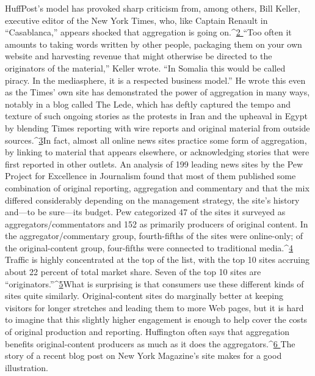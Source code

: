 HuffPost’s model has provoked sharp criticism from, among others, Bill Keller,
executive editor of the New York Times, who, like Captain Renault in ``Casablanca,''
appears shocked that aggregation is going on.^{\href{#endnotes-ch6}{2 }}``Too often it amounts
to taking words written by other people, packaging them on your own website
and harvesting revenue that might otherwise be directed to the originators of
the material,'' Keller wrote. ``In Somalia this would be called piracy. In the mediasphere,
it is a respected business model.'' He wrote this even as the Times’ own
site has demonstrated the power of aggregation in many ways, notably in a blog
called The Lede, which has deftly captured the tempo and texture of such ongoing
stories as the protests in Iran and the upheaval in Egypt by blending Times
reporting with wire reports and original material from outside sources.^{\href{#endnotes-ch6}{3}}In fact, almost all online news sites practice some form of aggregation, by linking
to material that appears elsewhere, or acknowledging stories that were first
reported in other outlets. An analysis of 199 leading news sites by the Pew Project
for Excellence in Journalism found that most of them published some combination
of original reporting, aggregation and commentary and that the mix differed
considerably depending on the management strategy, the site’s history and—to
be sure—its budget.
Pew categorized 47 of the sites it surveyed as aggregators/commentators and
152 as primarily producers of original content. In the aggregator/commentary
group, fourth-fifths of the sites were online-only; of the original-content group,
four-fifths were connected to traditional media.^{\href{#endnotes-ch6}{4 }}Traffic is highly concentrated at
the top of the list, with the top 10 sites accruing about 22 percent of total market
share. Seven of the top 10 sites are ``originators.''^{\href{#endnotes-ch6}{5}}What is surprising is that consumers use these different kinds of sites quite
similarly. Original-content sites do marginally better at keeping visitors for longer
stretches and leading them to more Web pages, but it is hard to imagine that
this slightly higher engagement is enough to help cover the costs of original
production and reporting.
Huffington often says that aggregation benefits original-content producers as
much as it does the aggregators.^{\href{#endnotes-ch6}{6 }}The story of a recent blog post on New York
Magazine’s site makes for a good illustration.
